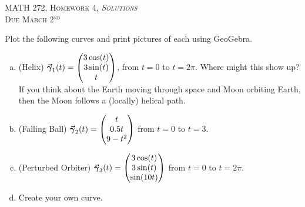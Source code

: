 \documentclass[12pt]{article} %
\begin{document}
\begin{center}
   \textsc{\large MATH 272, Homework 4, \emph{Solutions}}\\
   \textsc{Due March 2$^\textrm{nd}$}
\end{center}
\vspace{.5cm}

\begin{problem}
Plot the following curves and print pictures of each using GeoGebra.  
\begin{enumerate}[(a)]
	\item (Helix) $\boldsymbol{\vec{\gamma}}_1(t) = \begin{pmatrix} 3\cos(t) \\ 3\sin(t) \\ t\end{pmatrix}$, from $t=0$ to $t=2\pi$. Where might this show up? If you think about the Earth moving through space and Moon orbiting Earth, then the Moon follows a (locally) helical path.
	
	\item (Falling Ball) $\boldsymbol{\vec{\gamma}}_2(t) = \begin{pmatrix} t\\  0.5t \\ 9-t^2 \end{pmatrix}$ from $t=0$ to $t=3$.
	
	\item (Perturbed Orbiter) $\boldsymbol{\vec{\gamma}}_3(t) = \begin{pmatrix} 3\cos(t) \\ 3 \sin(t) \\ \sin(10t)\end{pmatrix}$ from $t=0$ to $t=2\pi$.
	
	\item Create your own curve.
\end{enumerate}
\end{problem}
\end{document}
